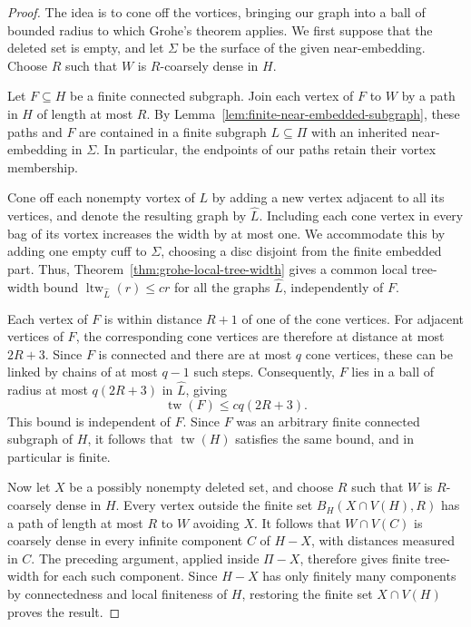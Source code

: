 \documentclass[10pt,a4paper]{amsart}
\theoremstyle{definition}
\begin{document}
\begin{proof}
The idea is to cone off the vortices, bringing our graph into a ball of bounded radius to which Grohe's theorem applies. We first suppose that the deleted set is empty, and let $\Sigma$ be the surface of the given near-embedding. Choose $R$ such that $W$ is $R$-coarsely dense in $H$.

Let $F\subseteq H$ be a finite connected subgraph. Join each vertex of $F$ to $W$ by a path in $H$ of length at most $R$. By Lemma~\ref{lem:finite-near-embedded-subgraph}, these paths and $F$ are contained in a finite subgraph $L\subseteq\Pi$ with an inherited near-embedding in $\Sigma$. In particular, the endpoints of our paths retain their vortex membership.

Cone off each nonempty vortex of $L$ by adding a new vertex adjacent to all its vertices, and denote the resulting graph by $\widehat L$. Including each cone vertex in every bag of its vortex increases the width by at most one. We accommodate this by adding one empty cuff to $\Sigma$, choosing a disc disjoint from the finite embedded part. Thus, Theorem~\ref{thm:grohe-local-tree-width} gives a common local tree-width bound $\operatorname{ltw}_{\widehat L}(r) \leq cr$ for all the graphs $\widehat L$, independently of $F$.

Each vertex of $F$ is within distance $R+1$ of one of the cone vertices. For adjacent vertices of $F$, the corresponding cone vertices are therefore at distance at most $2R+3$. Since $F$ is connected and there are at most $q$ cone vertices, these can be linked by chains of at most $q-1$ such steps. Consequently, $F$ lies in a ball of radius at most $q(2R+3)$ in $\widehat L$, giving
$$
\operatorname{tw}(F)\leq cq(2R+3).
$$
This bound is independent of $F$. Since $F$ was an arbitrary finite connected subgraph of $H$, it follows that $\operatorname{tw}(H)$ satisfies the same bound, and in particular is finite. 

Now let $X$ be a possibly nonempty deleted set, and choose $R$ such that $W$ is $R$-coarsely dense in $H$. Every vertex outside the finite set $B_H(X\cap V(H),R)$ has a path of length at most $R$ to $W$ avoiding $X$. It follows that $W\cap V(C)$ is coarsely dense in every infinite component $C$ of $H-X$, with distances measured in $C$. The preceding argument, applied inside $\Pi-X$, therefore gives finite tree-width for each such component. Since $H-X$ has only finitely many components by connectedness and local finiteness of $H$, restoring the finite set $X\cap V(H)$ proves the result.
\end{proof}
\end{document}
